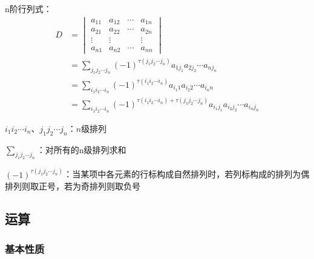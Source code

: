 \documentclass[12pt]{book}
\begin{document}
n阶行列式：
\begin{align*}
    D &= \begin{vmatrix}
        a_{11} & a_{12} & \cdots & a_{1n} \\
        a_{21} & a_{22} & \cdots & a_{2n} \\
        \vdots & \vdots &        & \vdots \\
        a_{n1} & a_{n2} & \cdots & a_{nn} 
    \end{vmatrix}\\
    &= \sum_{j_1 j_2\cdots j_n}{
        (-1)^{\tau(j_1 j_2\cdots j_n)}
        a_{1j_{1}} a_{2j_2} \cdots a_{nj_{n}}
    }\\
    &= \sum_{i_1 i_2\cdots i_n}{
        (-1)^{\tau(i_1 i_2\cdots i_n)}
        a_{i_{1}1} a_{i_{2}2} \cdots a_{i_{n}n}
    }\\
    &= \sum_{i_1 i_2\cdots i_n}{
        (-1)^{\tau(i_1 i_2\cdots i_n)+\tau(j_1 j_2\cdots j_n)}
        a_{i_{1}j_{1}} a_{i_{2}j_{2}} \cdots a_{i_{n}j_{n}}
    }
\end{align*}

\par $i_1 i_2\cdots i_n$、$j_1 j_2\cdots j_n$：$n$级排列
\par $\sum_{j_1 j_2\cdots j_n}$：对所有的n级排列求和
\par $(-1)^{\tau(j_1 j_2\cdots j_n)}$：当某项中各元素的行标构成自然排列时，若列标构成的排列为偶排列则取正号，若为奇排列则取负号


\subsection{运算}





\subsubsection{基本性质}
\end{document}
